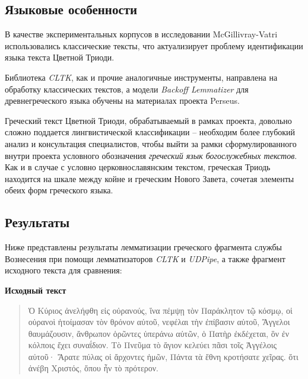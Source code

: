 \documentclass[
  letterpaper,
]{book}
\begin{document}
\hypertarget{sec-about_grc_lang}{%
\subsection{Языковые особенности}\label{sec-about_grc_lang}}

В качестве экспериментальных корпусов в исследовании McGillivray-Vatri
использовались классические тексты, что актуализирует проблему
идентификации языка текста Цветной Триоди.

Библиотека \emph{CLTK}, как и прочие аналогичные инструменты, направлена
на обработку классических текстов, а модели \emph{Backoff Lemmatizer}
для древнегреческого языка обучены на материалах проекта Perseus.

Греческий текст Цветной Триоди, обрабатываемый в рамках проекта,
довольно сложно поддается лингвистической классификации -- необходим
более глубокий анализ и консультация специалистов, чтобы выйти за рамки
сформулированного внутри проекта условного обозначения \emph{греческий
язык богослужебных текстов}. Как и в случае с условно церковнославянским
текстом, греческая Триодь находится на шкале между койне и греческим
Нового Завета, сочетая элементы обеих форм греческого языка.

\hypertarget{sec_lemm_grc_result}{%
\subsection{Результаты}\label{sec_lemm_grc_result}}

Ниже представлены результаты лемматизации греческого фрагмента службы
Вознесения при помощи лемматизаторов \emph{CLTK} и \emph{UDPipe}, а
также фрагмент исходного текста для сравнения:

\begin{tcolorbox}[enhanced jigsaw, rightrule=.15mm, breakable, colframe=quarto-callout-tip-color-frame, colback=white, leftrule=.75mm, left=2mm, arc=.35mm, opacityback=0, toprule=.15mm, bottomrule=.15mm]

\textbf{Исходный текст}\vspace{2mm}

\begin{quote}
Ὁ Κύριος ἀνελήφθη εἰς οὐρανούς, ἵνα πέμψῃ τὸν Παράκλητον τῷ κόσμῳ, οἱ
οὐρανοὶ ἡτοίμασαν τὸν θρόνον αὐτοῦ, νεφέλαι τὴν ἐπίβασιν αὐτοῦ, Ἄγγελοι
θαυμάζουσιν, ἄνθρωπον ὁρῶντες ὑπεράνω αὐτῶν, ὁ Πατὴρ ἐκδέχεται, ὃν ἐν
κόλποις ἔχει συναΐδιον. Τὸ Πνεῦμα τὸ ἅγιον κελεύει πᾶσι τοῖς Ἀγγέλοις
αὐτοῦ· Ἄρατε πύλας οἱ ἄρχοντες ἡμῶν, Πάντα τὰ ἔθνη κροτήσατε χεῖρας. ὅτι
ἀνέβη Χριστός, ὅπου ἦν τὸ πρότερον.
\end{quote}

\end{tcolorbox}
\end{document}
